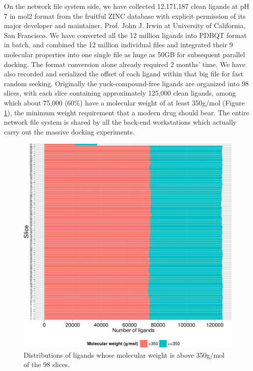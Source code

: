 On the network file system side, we have collected 12,171,187 clean ligands at pH 7 in mol2 format from the fruitful ZINC database \citep{532,1178} with explicit permission of its major developer and maintainer, Prof. John J. Irwin at University of California, San Francisco. We have converted all the 12 million ligands into PDBQT format in batch, and combined the 12 million individual files and integrated their 9 molecular properties into one single file as huge as 50GB for subsequent parallel docking. The format conversion alone already required 2 months' time. We have also recorded and serialized the offset of each ligand within that big file for fast random seeking. Originally the yuck-compound-free ligands are organized into 98 slices, with each slice containing approximately 125,000 clean ligands, among which about 75,000 (60\%) have a molecular weight of at least 350g/mol (Figure \ref{istar:gt350}), the minimum weight requirement that a modern drug should bear. The entire network file system is shared by all the back-end workstations which actually carry out the massive docking experiments.

\begin{figure}
\centering
\includegraphics[width=\linewidth]{istar/gt350.pdf}
\caption{Distributions of ligands whose molecular weight is above 350g/mol of the 98 slices.}
\label{istar:gt350}
\end{figure}

